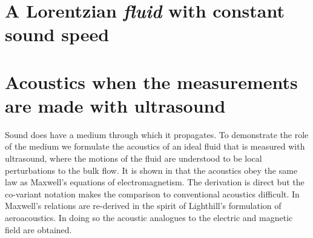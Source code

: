 




\section{A Lorentzian {\em fluid} with constant sound speed}\label{sec:int:EM}



\section{Acoustics when the measurements are made with ultrasound}\label{sec:Maxwell}

Sound does have a medium through which it propagates.
To demonstrate the role of the medium we formulate the acoustics of  an ideal fluid that is measured with ultrasound,
where the motions of the fluid are  understood to be local perturbations to the bulk flow.
It is shown in  that the acoustics  obey the same law as Maxwell's equations of electromagnetism.
The derivation is direct but the co-variant notation makes the comparison to conventional acoustics difficult.
In  Maxwell's relations are re-derived in the spirit of Lighthill's formulation of aeroacoustics.
In doing so the acoustic analogues to the electric and magnetic field are obtained.

